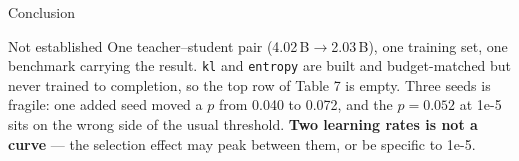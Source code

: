 \documentclass[aspectratio=169,11pt]{beamer}
\begin{document}
\begin{frame}{Conclusion}
\vspace{0.6em}
\begin{block}{Not established}
\small
One teacher--student pair (4.02\,B$\rightarrow$2.03\,B), one training set, one benchmark
carrying the result. \texttt{kl} and \texttt{entropy} are built and budget-matched but never
trained to completion, so the top row of Table 7 is empty. Three seeds is fragile: one added
seed moved a $p$ from 0.040 to 0.072, and the $p=0.052$ at 1e-5 sits on the wrong side of the
usual threshold. \textbf{Two learning rates is not a curve} --- the selection effect may peak
between them, or be specific to 1e-5.
\end{block}

\end{frame}
\end{document}
